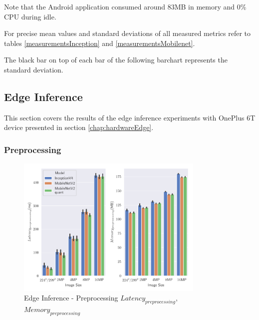 Note that the Android application consumed around 83MB in memory and 0\% CPU during idle.

For precise mean values and standard deviations of all measured metrics refer to tables \ref{measurementsInception} and \ref{measurementsMobilenet}.

The black bar on top of each bar of the following barchart represents the standard deviation.
\subsection{Edge Inference}
This section covers the results of the edge inference experiments with OnePlus 6T device presented in section \ref{chap:hardwareEdge}.
\subsubsection{Preprocessing}
\begin{figure}[H]
\centering
\includegraphics[width=0.8\textwidth]{./Bilder/single_plots/edge_inference_plots/Edge_Inference_Preprocessing.pdf}
\caption{Edge Inference - Preprocessing $Latency_{preprocessing}$, $Memory_{preprocessing}$}
\label{fig:EdgePrepro}
\end{figure}


